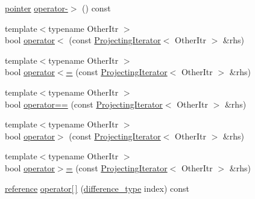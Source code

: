 \begin{DoxyCompactItemize}
\mbox{\hyperlink{classstanfordcpplib_1_1collections_1_1ProjectingIterator_a6bfec6a77e6f8fac8b106db3094ac7f6}{pointer}} \mbox{\hyperlink{classstanfordcpplib_1_1collections_1_1ProjectingIterator_aef4e7d4e0fa56e9f7509c555f73d24d2}{operator-\/$>$}} () const
\item 
{\footnotesize template$<$typename Other\+Itr $>$ }\\bool \mbox{\hyperlink{classstanfordcpplib_1_1collections_1_1ProjectingIterator_a2171ba1594da6be44807b54a5290035c}{operator$<$}} (const \mbox{\hyperlink{classstanfordcpplib_1_1collections_1_1ProjectingIterator}{Projecting\+Iterator}}$<$ Other\+Itr $>$ \&rhs)
\item 
{\footnotesize template$<$typename Other\+Itr $>$ }\\bool \mbox{\hyperlink{classstanfordcpplib_1_1collections_1_1ProjectingIterator_a59abc3b8c0a1969a54d4f65c57d23b29}{operator$<$=}} (const \mbox{\hyperlink{classstanfordcpplib_1_1collections_1_1ProjectingIterator}{Projecting\+Iterator}}$<$ Other\+Itr $>$ \&rhs)
\item 
{\footnotesize template$<$typename Other\+Itr $>$ }\\bool \mbox{\hyperlink{classstanfordcpplib_1_1collections_1_1ProjectingIterator_a331e67e84667eadc0f0eb3cc1700f939}{operator==}} (const \mbox{\hyperlink{classstanfordcpplib_1_1collections_1_1ProjectingIterator}{Projecting\+Iterator}}$<$ Other\+Itr $>$ \&rhs)
\item 
{\footnotesize template$<$typename Other\+Itr $>$ }\\bool \mbox{\hyperlink{classstanfordcpplib_1_1collections_1_1ProjectingIterator_aaccbfe5cf1c3ded5b01ccabf4de372dd}{operator$>$}} (const \mbox{\hyperlink{classstanfordcpplib_1_1collections_1_1ProjectingIterator}{Projecting\+Iterator}}$<$ Other\+Itr $>$ \&rhs)
\item 
{\footnotesize template$<$typename Other\+Itr $>$ }\\bool \mbox{\hyperlink{classstanfordcpplib_1_1collections_1_1ProjectingIterator_af787aa9c5b2aecc7af62c378aeb9c68d}{operator$>$=}} (const \mbox{\hyperlink{classstanfordcpplib_1_1collections_1_1ProjectingIterator}{Projecting\+Iterator}}$<$ Other\+Itr $>$ \&rhs)
\item 
\mbox{\hyperlink{classstanfordcpplib_1_1collections_1_1ProjectingIterator_ab734e7d93a20160ecd4ee87cec8336af}{reference}} \mbox{\hyperlink{classstanfordcpplib_1_1collections_1_1ProjectingIterator_af8504b1545623760c8780ee24aa03d06}{operator\mbox{[}$\,$\mbox{]}}} (\mbox{\hyperlink{classstanfordcpplib_1_1collections_1_1ProjectingIterator_ad050e8e82b0962bb9ebd0e7c23b436ac}{difference\+\_\+type}} index) const
\end{DoxyCompactItemize}


